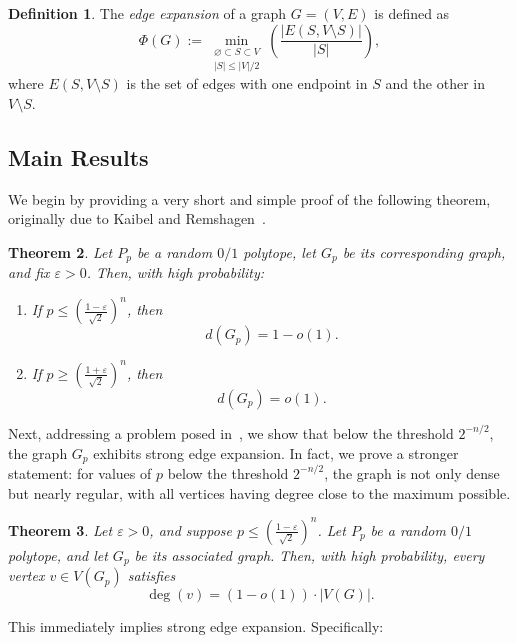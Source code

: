 \documentclass[11pt]{article}
\theoremstyle{definition}
\newtheorem{definition}{Definition}[section]
\theoremstyle{plain}
\newtheorem{thm}[definition]{Theorem}
\begin{document}
\begin{definition}
 The \emph{edge expansion} of a graph \( G = (V, E) \) is defined as
\[
\Phi(G) :=  \min_{\substack{\varnothing \subset S \subset V \\ |S| \leq |V|/2 }} \left(\frac{|E(S, V \setminus S)|}{|S|} \right),
\]
where \( E(S, V \setminus S) \) is the set of edges with one endpoint in \( S \) and the other in \( V \setminus S \).   
\end{definition}

\subsection{Main Results}

We begin by providing a very short and simple proof of the following theorem, originally due to Kaibel and Remshagen~\cite{KaibelRemshagenDensity}.

\begin{thm} \label{thm: edge-density}
Let $P_p$ be a random $0/1$ polytope, let $G_p$ be its corresponding graph, and fix $\varepsilon > 0$. Then, with high probability:
\begin{enumerate}
    \item If $p \leq \left(\frac{1 - \varepsilon}{\sqrt{2}}\right)^{n}$, then
    \[
    d(G_p) = 1 - o(1).
    \]
    
    \item If $p \geq \left(\frac{1+\varepsilon}{\sqrt{2}}\right)^{n}$, then
    \[
    d(G_p) = o(1).
    \]
\end{enumerate}
\end{thm}


Next, addressing a problem posed in~\cite{KaibelRemshagenDensity}, we show that below the threshold \( 2^{-n/2} \), the graph $G_p$ exhibits strong edge expansion. 
In fact, we prove a stronger statement: for values of \( p \) below the threshold \( 2^{-n/2} \), the graph is not only dense but nearly regular, with all vertices having degree close to the maximum possible. 

\begin{thm} \label{thm: edge-expansion}
Let \( \varepsilon > 0 \), and suppose \( p \leq \left(\frac{1 - \varepsilon}{\sqrt{2}}\right)^n \). Let \( P_p \) be a random $0/1$ polytope, and let \( G_p \) be its associated graph. Then, with high probability, every vertex \( v \in V(G_p) \) satisfies
\[
\deg(v) = (1 - o(1)) \cdot |V(G)|.
\]
\end{thm}

This immediately implies strong edge expansion. Specifically: 
\end{document}
